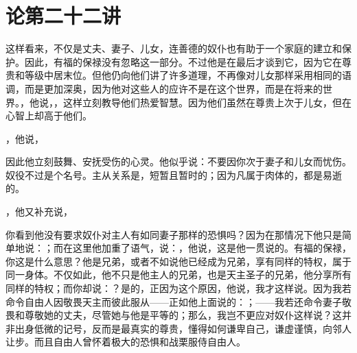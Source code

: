 \section{论第二十二讲}

\par

\par

这样看来，不仅是丈夫、妻子、儿女，连善德的奴仆也有助于一个家庭的建立和保护。因此，有福的保禄没有忽略这一部分。不过他是在最后才谈到它，因为它在尊贵和等级中居末位。但他仍向他们讲了许多道理，不再像对儿女那样采用相同的语调，而是更加深奥，因为他对这些人的应许不是在这个世界，而是在将来的世界。，他说，，这样立刻教导他们热爱智慧。因为他们虽然在尊贵上次于儿女，但在心智上却高于他们。\par

，他说，\par

因此他立刻鼓舞、安抚受伤的心灵。他似乎说：不要因你次于妻子和儿女而忧伤。奴役不过是个名号。主从关系是，短暂且暂时的；因为凡属于肉体的，都是易逝的。\par

，他又补充说，\par

你看到他没有要求奴仆对主人有如同妻子那样的恐惧吗？因为在那情况下他只是简单地说：；而在这里他加重了语气，说：，他说，这是他一贯说的。有福的保禄，你这是什么意思？他是兄弟，或者不如说他已经成为兄弟，享有同样的特权，属于同一身体。不仅如此，他不只是他主人的兄弟，也是天主圣子的兄弟，他分享所有同样的特权；而你却说：？是的，正因为这个原因，他说，我才这样说。因为我若命令自由人因敬畏天主而彼此服从——正如他上面说的：；——我若还命令妻子敬畏和尊敬她的丈夫，尽管她与他是平等的；那么，我岂不更应对奴仆这样说？这并非出身低微的记号，反而是最真实的尊贵，懂得如何谦卑自己，谦虚谨慎，向邻人让步。而且自由人曾怀着极大的恐惧和战栗服侍自由人。\par

